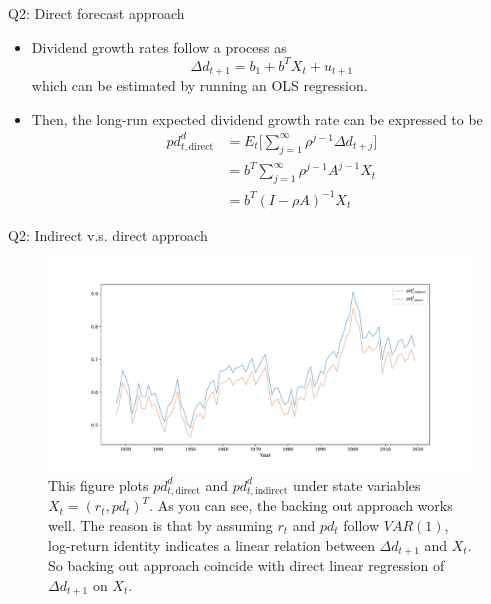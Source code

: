\documentclass[10pt,t]{beamer}
\begin{document}
\begin{frame}{Q2: Direct forecast approach}
\begin{itemize}
  \item Dividend growth rates follow a process as
  $$
  \Delta d_{t+1} = b_1 + b^T X_t + u_{t+1}
  $$
  which can be estimated by running an OLS regression.
  \item Then, the long-run expected dividend growth rate can be expressed to be
  \begin{equation*}
  \begin{split}
  pd^{d}_{t, \text{direct}} & = E_{t} \bigg[\sum_{j = 1}^{\infty} \rho^{j - 1} \Delta d_{t+j}\bigg] \\
  & = b^T \sum_{j = 1}^{\infty} \rho^{j - 1} A^{j - 1} X_t \\
  & = b^T (I - \rho A)^{-1}X_t
  \end{split}
  \end{equation*}
\end{itemize}
\end{frame}



\begin{frame}{Q2: Indirect v.s. direct approach}
\begin{figure}[h!]
\centering
\includegraphics[width=\linewidth]{q2fig1.pdf}
\caption{This figure plots $pd^{d}_{t, \text{direct}}$ and $pd^{d}_{t, \text{indirect}}$ under state variables $X_t = (r_t, pd_t)^T$. As you can see, the backing out approach works well. The reason is that by assuming $r_t$ and $pd_t$ follow $VAR(1)$, log-return identity indicates a linear relation between $\Delta d_{t+1}$ and $X_t$. So backing out approach coincide with direct linear regression of $\Delta d_{t+1}$ on $X_t$.}
\end{figure}
\end{frame}
\end{document}

